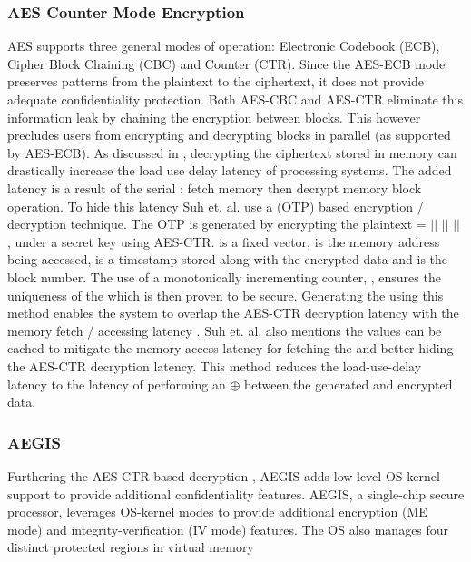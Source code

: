\subsubsection{AES Counter Mode Encryption}
AES supports three general modes of operation: Electronic Codebook (ECB),
Cipher Block Chaining (CBC) and Counter (CTR). Since the AES-ECB mode preserves
patterns from the plaintext to the ciphertext, it does not provide adequate
confidentiality protection. Both AES-CBC and AES-CTR eliminate this information
leak by chaining the encryption between blocks. This however precludes users
from encrypting and decrypting blocks in parallel (as supported by AES-ECB). As
discussed in \cite{suh-memIntEnc}, decrypting the ciphertext stored in memory
can drastically increase the load use delay latency of processing systems. The
added latency is a result of the serial : fetch memory then decrypt memory
block operation. To hide this latency Suh et. al. use a  (OTP)
based encryption / decryption technique. The OTP is generated by encrypting the
plaintext = { $||$  $||$  $||$ }, under a secret
key using AES-CTR.  is a fixed vector,  is the memory address
being accessed,  is a timestamp stored along with the encrypted data and
 is the block number. The use of a monotonically incrementing counter,
, ensures the uniqueness of the  which is then proven to be
secure. Generating the  using this method enables the system to overlap
the AES-CTR decryption latency with the memory fetch / accessing latency
\cite{suh-memIntEnc}. Suh et. al. also mentions the  values can be
cached to mitigate the memory access latency for fetching the  and
better hiding the AES-CTR decryption latency. This method reduces the
load-use-delay latency to the latency of performing an $\oplus$ between the
generated  and encrypted data.

\subsubsection{AEGIS}
Furthering the AES-CTR based decryption \cite{suh-memIntEnc}, AEGIS
\cite{aegis} adds low-level OS-kernel support to provide additional
confidentiality features. AEGIS, a single-chip secure processor, leverages
OS-kernel modes to provide additional encryption (ME mode) and
integrity-verification (IV mode) features. The OS also manages four distinct
protected regions in virtual memory

